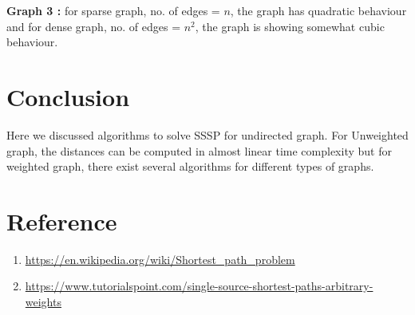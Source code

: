 \documentclass[conference]{IEEEtran}
\begin{document}


\textbf{Graph 3 :} for sparse graph, no. of edges = $n$, the graph has quadratic behaviour and for dense graph, no. of edges = $n^2$, the graph is showing somewhat cubic behaviour.










\section{Conclusion\\}
 Here we discussed algorithms to solve SSSP for undirected graph.
For Unweighted graph, the distances can be computed in almost linear time complexity but for weighted graph, there exist several algorithms for different types of graphs.

\section{Reference}
\begin{enumerate}
    \item \url{https://en.wikipedia.org/wiki/Shortest_path_problem}
    \item \url{https://www.tutorialspoint.com/single-source-shortest-paths-arbitrary-weights}
\end{enumerate}
\end{document}
